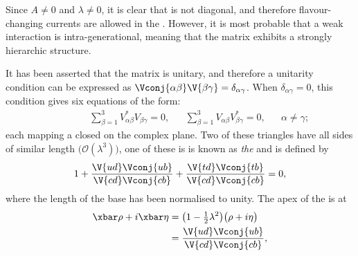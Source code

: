Since $A\neq0$ and $\lambda\neq0$, it is clear that \VCKM is not diagonal, and therefore
flavour-changing currents are allowed in the \sm.
However,
it is most probable that a weak interaction is intra-generational, meaning that
the \ckm matrix exhibits a strongly hierarchic structure.


It has been asserted that the \ckm matrix is unitary, and therefore a
unitarity condition can be expressed as
$\Vconj{\alpha\beta}\V{\beta\gamma}=\delta_{\alpha\gamma}$.
When $\delta_{\alpha\gamma}=0$, this condition gives six equations of the form:
\begin{align}
  \phantom{\beta\neq\gamma}
  &&\sum_{\beta=1}^3V_{\alpha\beta}^*V_{\beta\gamma}^{\phantom{*}} = 0,
  &&\sum_{\beta=1}^3V_{\alpha\beta}^{\phantom{*}}V_{\beta\gamma}^*=0,
  &&\alpha\neq\gamma;
  \label{eq:th:offdiag}
\end{align}
each mapping a closed  on the complex plane.
Two of these triangles have all sides of similar length
$\big(\mathcal{O}(\lambda^3)\big)$,
one of these is
is known as \emph{the} \ut and is defined by
\begin{equation}
  1 + \frac{\V{ud}\Vconj{ub}}{\V{cd}\Vconj{cb}} + \frac{\V{td}\Vconj{tb}}{\V{cd}\Vconj{cb}} = 0,
  \label{eq:th:ut}
\end{equation}
where the length of the base has been normalised to unity.
The apex of the \ut is at
\begin{align}
  \xbar\rho+i\xbar\eta &= \big(1-\tfrac12\lambda^2\big)\big(\rho+i\eta\big)
  \nonumber\\
  &=\frac{\V{ud}\Vconj{ub}}{\V{cd}\Vconj{cb}},
\end{align}
